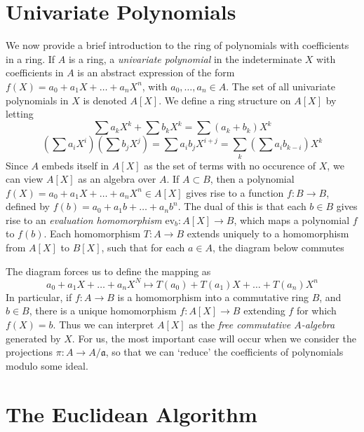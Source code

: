 \section{Univariate Polynomials}

We now provide a brief introduction to the ring of polynomials with coefficients in a ring. If $A$ is a ring, a {\it univariate polynomial} in the indeterminate $X$ with coefficients in $A$ is an abstract expression of the form $f(X) = a_0 + a_1 X + \dots + a_n X^n$, with $a_0,\dots,a_n \in A$. The set of all univariate polynomials in $X$ is denoted $A[X]$. We define a ring structure on $A[X]$ by letting
%
\[ \sum a_k X^k + \sum b_k X^k = \sum (a_k + b_k) X^k \]
%
\[ \left( \sum a_i X^i \right) \left( \sum b_j X^j \right) = \sum a_i b_j X^{i + j} = \sum_k \left( \sum a_i b_{k - i} \right) X^k \]
%
Since $A$ embeds itself in $A[X]$ as the set of terms with no occurence of $X$, we can view $A[X]$ as an algebra over $A$. If $A \subset B$, then a polynomial $f(X) = a_0 + a_1 X + \dots + a_n X^n \in A[X]$ gives rise to a function $f: B \to B$, defined by $f(b) = a_0 + a_1 b + \dots + a_n b^n$. The dual of this is that each $b \in B$ gives rise to an {\it evaluation homomorphism} $\text{ev}_b: A[X] \to B$, which maps a polynomial $f$ to $f(b)$. Each homomorphism $T: A \to B$ extends uniquely to a homomorphism from $A[X]$ to $B[X]$, such that for each $a \in A$, the diagram below commutes
%
\begin{center}
\end{center}
%
The diagram forces us to define the mapping as
%
\[ a_0 + a_1 X + \dots + a_n X^N \mapsto T(a_0) + T(a_1) X + \dots + T(a_n) X^n \]
%
In particular, if $f: A \to B$ is a homomorphism into a commutative ring $B$, and $b \in B$, there is a unique homomorphism $f: A[X] \to B$ extending $f$ for which $f(X) = b$. Thus we can interpret $A[X]$ as the {\it free commutative $A$-algebra} generated by $X$. For us, the most important case will occur when we consider the projections $\pi: A \to A/\mathfrak{a}$, so that we can `reduce' the coefficients of polynomials modulo some ideal.

\section{The Euclidean Algorithm}

